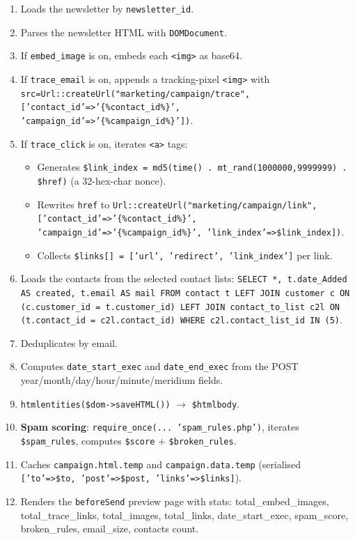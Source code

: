 \documentclass[11pt,a4paper]{article}
\begin{document}
\begin{enumerate}[leftmargin=1.6em,itemsep=2pt]
  \item Loads the newsletter by \texttt{newsletter\_id}.
  \item Parses the newsletter HTML with \texttt{DOMDocument}.
  \item If \texttt{embed\_image} is on, embeds each \texttt{<img>}
        as base64.
  \item If \texttt{trace\_email} is on, appends a tracking-pixel
        \texttt{<img>} with
        \texttt{src=Url::createUrl("marketing/campaign/trace",
        ['contact\_id'=>'\{\%contact\_id\%\}',
        'campaign\_id'=>'\{\%campaign\_id\%\}'])}.
  \item If \texttt{trace\_click} is on, iterates \texttt{<a>} tags:
        \begin{itemize}[itemsep=2pt]
          \item Generates \texttt{\$link\_index = md5(time() .
                mt\_rand(1000000,9999999) . \$href)} (a 32-hex-char
                nonce).
          \item Rewrites \texttt{href} to
                \texttt{Url::createUrl("marketing/campaign/link",
                ['contact\_id'=>'\{\%contact\_id\%\}',
                'campaign\_id'=>'\{\%campaign\_id\%\}',
                'link\_index'=>\$link\_index])}.
          \item Collects \texttt{\$links[] = ['url', 'redirect',
                'link\_index']} per link.
        \end{itemize}
  \item Loads the contacts from the selected contact lists:
        \texttt{SELECT *, t.date\_Added AS created, t.email AS mail
        FROM contact t LEFT JOIN customer c ON (c.customer\_id =
        t.customer\_id) LEFT JOIN contact\_to\_list c2l ON
        (t.contact\_id = c2l.contact\_id) WHERE c2l.contact\_list\_id
        IN (5)}.
  \item Deduplicates by email.
  \item Computes \texttt{date\_start\_exec} and
        \texttt{date\_end\_exec} from the POST year/month/day/hour/minute/meridium
        fields.
  \item \texttt{htmlentities(\$dom->saveHTML())} $\to$ \texttt{\$htmlbody}.
  \item \textbf{Spam scoring}: \texttt{require\_once(... 'spam\_rules.php')},
        iterates \texttt{\$spam\_rules}, computes \texttt{\$score} +
        \texttt{\$broken\_rules}.
  \item Caches \texttt{campaign.html.temp} and
        \texttt{campaign.data.temp} (serialised
        \texttt{['to'=>\$to, 'post'=>\$post, 'links'=>\$links]}).
  \item Renders the \texttt{beforeSend} preview page with stats:
        total\_embed\_images, total\_trace\_links, total\_images,
        total\_links, date\_start\_exec, spam\_score, broken\_rules,
        email\_size, contacts count.
\end{enumerate}
\end{document}
